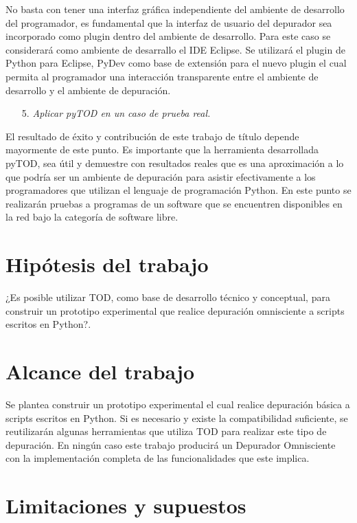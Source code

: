 \documentclass[12pt,legalpaper]{report}
\begin{document}
No basta con tener una interfaz gráfica independiente del ambiente de desarrollo del programador, es fundamental que la interfaz de usuario del depurador sea incorporado como plugin dentro del ambiente de desarrollo.  Para este caso se considerará como ambiente de desarrallo el IDE Eclipse\footnotemark[1].  Se utilizará el plugin de Python para Eclipse, PyDev como base de extensión para el nuevo plugin el cual permita al programador una interacción transparente entre el ambiente de desarrollo y el ambiente de depuración.


\begin{itemize}
\item[5.] \textit{Aplicar pyTOD en un caso de prueba real.}
\end{itemize}

El resultado de éxito y contribución de este trabajo de título depende mayormente de este punto.  Es importante que la herramienta desarrollada pyTOD, sea útil y demuestre con resultados reales que es una aproximación a lo que podría ser un ambiente de depuración para asistir efectivamente a los programadores que utilizan el lenguaje de programación Python.  En este punto se realizarán pruebas a programas de un software que se encuentren disponibles en la red bajo la categoría de software libre.


	\section{Hipótesis del trabajo}

    ¿Es posible utilizar TOD, como base de desarrollo técnico y conceptual, para construir un prototipo experimental que realice depuración omnisciente a scripts escritos en Python?.

	\section{Alcance del trabajo}

    Se plantea construir un prototipo experimental el cual realice depuración básica a scripts escritos en Python. Si es necesario y existe la compatibilidad suficiente, se reutilizarán algunas herramientas que utiliza TOD para realizar este tipo de depuración. En ningún caso este trabajo producirá un Depurador Omnisciente con la implementación completa de las funcionalidades que este implica.

	\section{Limitaciones y supuestos}
\end{document}
